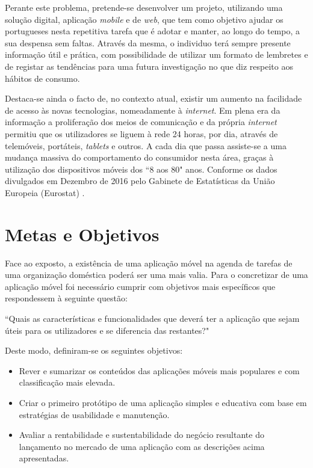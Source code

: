 Perante este problema, pretende-se desenvolver um projeto, utilizando uma solução digital, aplicação \textit{mobile} e de \textit{web}, que tem como objetivo ajudar os portugueses nesta repetitiva tarefa que é adotar e manter, ao longo do tempo, a sua despensa sem faltas.
Através da mesma, o individuo terá sempre presente informação útil e prática, com possibilidade de utilizar um formato de lembretes e de registar as tendências para uma futura investigação no que diz respeito aos hábitos de consumo.

Destaca-se ainda o facto de, no contexto atual, existir um aumento na facilidade de acesso às novas tecnologias, nomeadamente à \textit{internet}. Em plena era da informação a proliferação dos meios de comunicação e da própria \textit{internet} permitiu que os utilizadores se liguem à rede 24 horas, por dia, através de telemóveis, portáteis, \textit{tablets} e outros. A cada dia que passa assiste-se a uma mudança massiva do comportamento do consumidor nesta área, graças à utilização dos dispositivos móveis dos ``8 aos 80" anos. Conforme os dados divulgados em Dezembro de 2016 pelo Gabinete de Estatísticas da União Europeia (Eurostat) \cite{eurostat:internetAccess2016}.

%
%
\section{Metas e Objetivos} \label{sec12}
Face ao exposto, a existência de uma aplicação móvel na agenda de tarefas de uma organização doméstica poderá ser uma mais valia. Para o concretizar de uma aplicação móvel foi necessário cumprir com objetivos mais específicos que respondessem à seguinte questão: 

``Quais as características e funcionalidades que deverá ter a aplicação que sejam úteis para os utilizadores e se diferencia das restantes?"

Deste modo, definiram-se os seguintes objetivos:
\begin{itemize} \itemsep 0pt
	\item Rever e sumarizar os conteúdos das aplicações móveis mais populares e com classificação mais elevada.
	\item Criar o primeiro protótipo de uma aplicação simples e educativa com base em estratégias de usabilidade e manutenção.
	\item Avaliar a rentabilidade e sustentabilidade do negócio resultante do lançamento no mercado de uma aplicação com as descrições acima apresentadas.
\end{itemize}


